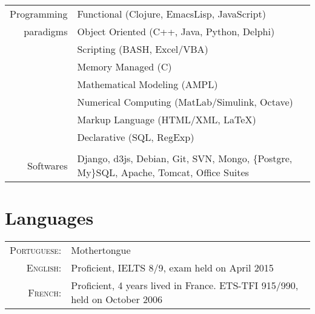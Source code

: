 \documentclass[a4paper,10pt]{article} %
\begin{document}
\begin{tabular}{rp{11cm}}
Programming & Functional (Clojure, EmacsLisp, JavaScript)\\
paradigms & Object Oriented (C++, Java, Python, Delphi)\\
& Scripting (BASH, Excel/VBA)\\
& Memory Managed (C)\\
& Mathematical Modeling (AMPL) \\
& Numerical Computing (MatLab/Simulink, Octave) \\
& Markup Language (HTML/XML, LaTeX) \\
& Declarative (SQL, RegExp) \\
&\\

Softwares &
Django, d3js, Debian, Git, SVN, Mongo, \{Postgre, My\}SQL,
Apache, Tomcat, Office Suites \\




\end{tabular}


\section{Languages}

\begin{tabular}{rl}
  \textsc{Portuguese:} &
  Mothertongue\\

  \textsc{English:} &
  Proficient, IELTS 8/9, exam held on April 2015\\

  \textsc{French:} &
  Proficient, 4 years lived in France. ETS-TFI 915/990, held on October 2006\\



\end{tabular}
\end{document}
